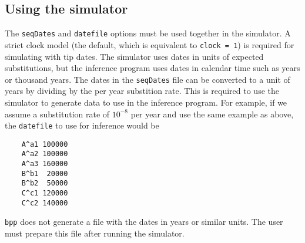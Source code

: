 \documentclass[11pt]{article}
\begin{document}
\subsection{Using the simulator}
The \texttt{seqDates} and \texttt{datefile} options must be used together in the simulator.
A strict clock model (the default, which is equivalent to \texttt{clock = 1}) is required for simulating with tip dates. 
The simulator uses dates in units of expected substitutions, but the inference program uses dates in calendar time such as years or thousand years. 
The dates in the \texttt{seqDates} file can be converted to a unit of years by dividing by the per year substition rate.
This is required to use the simulator to generate data to use in the inference program.
For example, if we assume a substitution rate of $10^{-8}$ per year and use the same example as above, the \texttt{datefile} to use for inference would be
\begin{verbatim}
	A^a1 100000
	A^a2 100000
	A^a3 160000
	B^b1  20000
	B^b2  50000
	C^c1 120000
	C^c2 140000
\end{verbatim}
\texttt{bpp} does not generate a file with the dates in years or similar units. 
The user must prepare this file after running the simulator.
 
\end{document}
